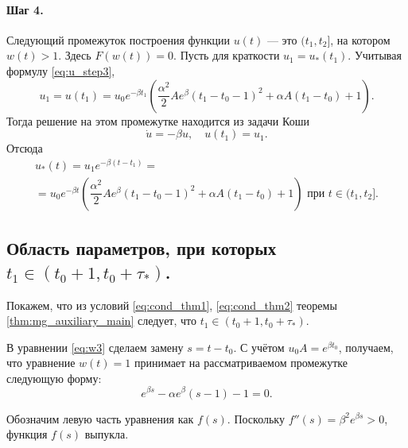 \paragraph{Шаг 4.} Следующий промежуток построения функции $u(t)$ --- это $(t_1, t_2]$, на котором $w(t) > 1$. Здесь $F(w(t)) = 0$. Пусть для краткости $u_1 = u_*(t_1)$. Учитывая формулу \eqref{eq:u_step3},
\begin{equation*}
	u_1 = u(t_1) = u_0 e^{-\beta t_1}\left(\dfrac{\alpha^2}{2}Ae^{\beta}(t_1 - t_0 - 1)^2+\alpha A(t_1 - t_0)+1\right).
\end{equation*}
Тогда решение на этом промежутке находится из задачи Коши
\begin{equation*}
	\dot{u}=-\beta u,\quad u(t_1)=u_1.
\end{equation*}
Отсюда 
\begin{multline}
	\label{eq:u_step4}
	u_*(t)= u_1 e^{-\beta(t - t_1)} =\\= u_0 e^{-\beta t}\left(\dfrac{\alpha^2}{2}Ae^{\beta}(t_1 - t_0 - 1)^2 + \alpha A(t_1 - t_0) + 1\right) \text{ при } t \in (t_1,t_2].
\end{multline}
%
\subsection{Область параметров, при которых $t_1\in (t_0+1,t_0+\tau_*)$.}\label{ch2:ssect_params}

Покажем, что из условий \eqref{eq:cond_thm1}, \eqref{eq:cond_thm2} теоремы \ref{thm:mg_auxiliary_main} следует, что $t_1 \in (t_0+1,t_0+\tau_*)$.

В уравнении \eqref{eq:w3} сделаем замену $s = t - t_0$. С учётом $u_0A=e^{\beta t_0}$, получаем, что уравнение $w(t)=1$ принимает на рассматриваемом промежутке следующую форму:
\begin{equation}
	\label{eq:f}
	e^{\beta s} - \alpha e^{\beta}(s-1) - 1 = 0.
\end{equation}

Обозначим левую часть уравнения как $f(s)$. Поскольку $f''(s) = \beta^2 e^{\beta s} > 0$, функция $f(s)$ выпукла.

